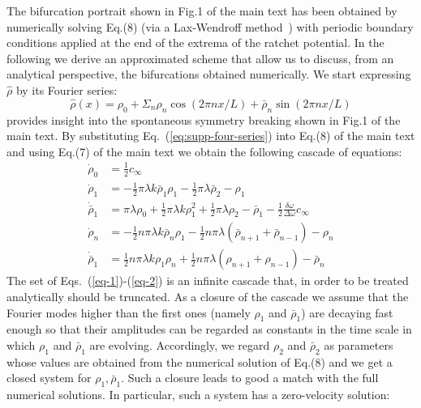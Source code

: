 \documentclass[prl,aps,twocolumn, floatfix, superscriptaddress,showpacs]{revtex4}
\begin{document}
\begin{widetext}
The bifurcation portrait shown in Fig.1 of the main text has been obtained by numerically solving Eq.(8) (via a Lax-Wendroff method~\cite{Numerical-Recipes}) with periodic boundary conditions applied at the end of the extrema of the ratchet potential. In the following we derive an approximated scheme that allow us to discuss, from an analytical perspective, the bifurcations obtained numerically.
We start expressing $\hat\rho$ by its Fourier series:
\begin{equation}
 \hat\rho(x)=\rho_0+\Sigma_n \rho_n \cos(2\pi n x/L)+\bar\rho_n \sin(2\pi n x/L)
 \label{eq:supp-four-series}
\end{equation}
provides insight into the spontaneous symmetry breaking shown in Fig.1 of the main text. 
By substituting Eq.~(\ref{eq:supp-four-series}) into Eq.(8) of the main text and using Eq.(7) of the main text we obtain the following cascade of equations:
\begin{subequations}\label{eq:fourier}
\begin{align}
 \dot{\rho}_0&=\frac{1}{2}c_\infty\label{eq-1}\\
 \dot{\rho}_1&=-\frac{1}{2}\pi \lambda k \bar{\rho}_1\rho_1-\frac{1}{2} \pi \lambda \bar\rho_2 -\rho_1\\
 \dot{\bar\rho}_1&=\pi\lambda \rho_0 +\frac{1}{2}\pi \lambda k \rho^2_1+\frac{1}{2} \pi \lambda \rho_2 -\bar\rho_1-\frac{1}{2}\frac{\delta\omega}{\Delta\omega}c_\infty \\
 \dot{\rho}_n&=-\frac{1}{2}n\pi \lambda k \bar{\rho}_n\rho_1-\frac{1}{2} n\pi \lambda (\bar\rho_{n+1}+\bar\rho_{n-1}) -\rho_n\\
\dot{\bar\rho}_1&=\frac{1}{2}n\pi \lambda k \rho_1\rho_n+\frac{1}{2} n \pi \lambda (\rho_{n+1}+\rho_{n-1}) -\bar\rho_n\label{eq-2}
\end{align}
\end{subequations}
The set of Eqs.~(\ref{eq-1})-(\ref{eq-2}) is an infinite cascade that, in order to be treated analytically should be truncated. As a closure of the cascade we assume that the Fourier modes higher than the first ones (namely $\rho_1$ and $\bar \rho_1$) are decaying fast enough so that their amplitudes can be regarded as constants in the time scale in which $\rho_1$ and $\bar \rho_1$ are evolving. Accordingly, we regard $\rho_2$ and $\bar\rho_2$ as parameters whose values are obtained from the numerical solution of Eq.(8) and we get a closed system for $\rho_{1},\bar{\rho}_{1}$. Such a closure leads to good a match with the full numerical solutions.
In particular, such a system has a zero-velocity solution: 

\end{widetext}
\end{document}
